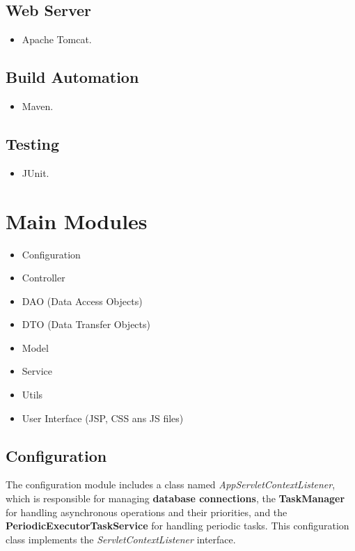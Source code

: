 \subsection*{Web Server} 

\begin{itemize}
    \item Apache Tomcat.
\end{itemize}

\subsection*{Build Automation}

\begin{itemize}
    \item Maven.
\end{itemize}

\subsection*{Testing}

\begin{itemize}
    \item JUnit.
\end{itemize}

\newpage

\section{Main Modules}
\begin{itemize}
    \item Configuration
    \item Controller
    \item DAO (Data Access Objects)
    \item DTO (Data Transfer Objects)
    \item Model 
    \item Service
    \item Utils
    \item User Interface (JSP, CSS ans JS files)
\end{itemize}

\subsection*{Configuration}

The configuration module includes a class named \textit{AppServletContextListener}, which is responsible 
for managing \textbf{database connections}, the \textbf{TaskManager} for handling asynchronous operations and their priorities, 
and the \textbf{PeriodicExecutorTaskService} for handling periodic tasks. This configuration class implements 
the \textit{ServletContextListener} interface.

